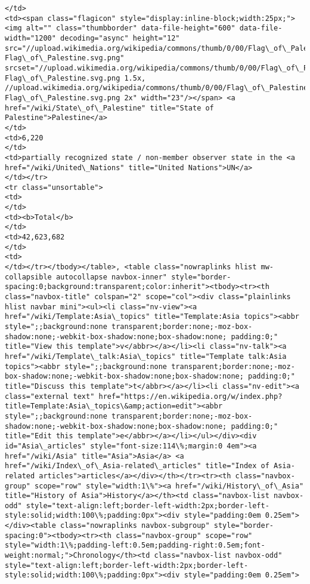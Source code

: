 \documentclass[11pt]{article}
\begin{document}
\begin{Verbatim}[commandchars=\\\{\}]
</td>
<td><span class="flagicon" style="display:inline-block;width:25px;"><img alt="" class="thumbborder" data-file-height="600" data-file-width="1200" decoding="async" height="12" src="//upload.wikimedia.org/wikipedia/commons/thumb/0/00/Flag\_of\_Palestine.svg/23px-Flag\_of\_Palestine.svg.png" srcset="//upload.wikimedia.org/wikipedia/commons/thumb/0/00/Flag\_of\_Palestine.svg/35px-Flag\_of\_Palestine.svg.png 1.5x, //upload.wikimedia.org/wikipedia/commons/thumb/0/00/Flag\_of\_Palestine.svg/46px-Flag\_of\_Palestine.svg.png 2x" width="23"/></span> <a href="/wiki/State\_of\_Palestine" title="State of Palestine">Palestine</a>
</td>
<td>6,220
</td>
<td>partially recognized state / non-member observer state in the <a href="/wiki/United\_Nations" title="United Nations">UN</a>
</td></tr>
<tr class="unsortable">
<td>
</td>
<td><b>Total</b>
</td>
<td>42,623,682
</td>
<td>
</td></tr></tbody></table>, <table class="nowraplinks hlist mw-collapsible autocollapse navbox-inner" style="border-spacing:0;background:transparent;color:inherit"><tbody><tr><th class="navbox-title" colspan="2" scope="col"><div class="plainlinks hlist navbar mini"><ul><li class="nv-view"><a href="/wiki/Template:Asia\_topics" title="Template:Asia topics"><abbr style=";;background:none transparent;border:none;-moz-box-shadow:none;-webkit-box-shadow:none;box-shadow:none; padding:0;" title="View this template">v</abbr></a></li><li class="nv-talk"><a href="/wiki/Template\_talk:Asia\_topics" title="Template talk:Asia topics"><abbr style=";;background:none transparent;border:none;-moz-box-shadow:none;-webkit-box-shadow:none;box-shadow:none; padding:0;" title="Discuss this template">t</abbr></a></li><li class="nv-edit"><a class="external text" href="https://en.wikipedia.org/w/index.php?title=Template:Asia\_topics\&amp;action=edit"><abbr style=";;background:none transparent;border:none;-moz-box-shadow:none;-webkit-box-shadow:none;box-shadow:none; padding:0;" title="Edit this template">e</abbr></a></li></ul></div><div id="Asia\_articles" style="font-size:114\%;margin:0 4em"><a href="/wiki/Asia" title="Asia">Asia</a> <a href="/wiki/Index\_of\_Asia-related\_articles" title="Index of Asia-related articles">articles</a></div></th></tr><tr><th class="navbox-group" scope="row" style="width:1\%"><a href="/wiki/History\_of\_Asia" title="History of Asia">History</a></th><td class="navbox-list navbox-odd" style="text-align:left;border-left-width:2px;border-left-style:solid;width:100\%;padding:0px"><div style="padding:0em 0.25em"></div><table class="nowraplinks navbox-subgroup" style="border-spacing:0"><tbody><tr><th class="navbox-group" scope="row" style="width:1\%;padding-left:0.5em;padding-right:0.5em;font-weight:normal;">Chronology</th><td class="navbox-list navbox-odd" style="text-align:left;border-left-width:2px;border-left-style:solid;width:100\%;padding:0px"><div style="padding:0em 0.25em">

\end{Verbatim}
\end{document}
